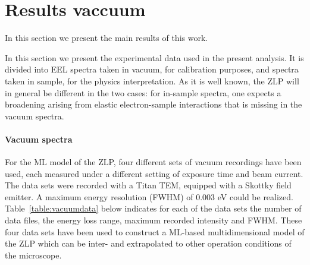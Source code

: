 \section{Results vaccuum}
\label{sec:results_vacuum}

In this section we present the main results of this work.

In this section we present the experimental data used
in the present analysis.
%
It is divided into EEL spectra taken in vacuum, for calibration
purposes, and spectra taken in sample, for the physics interpretation.
%
As it is well known, the ZLP will in general be different
in the two cases: for in-sample spectra, one expects a broadening
arising from elastic electron-sample interactions that is missing in
the vacuum spectra.

\paragraph{Vacuum spectra}
%
For the ML model of the ZLP, four different sets of vacuum recordings
have been used, each measured under a different setting of exposure time 
and beam current. 
%
The data sets were recorded with a Titan TEM, equipped with a Skottky field emitter.
A maximum energy resolution (FWHM) of 0.003 eV could be realized. 
%
Table~\ref{table:vacuumdata} below indicates for each of the data sets the number of data files, 
the energy loss range, maximum recorded intensity and FWHM. 
%
These four data sets have been used to construct a ML-based
multidimensional model of the ZLP which can be inter- and extrapolated
to other operation conditions of the microscope.



